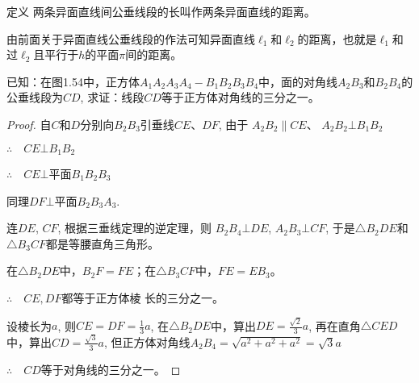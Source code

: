 \begin{blk}
  {定义} 两条异面直线间公垂线段的长叫作两条异面直线的距离。
\end{blk}


由前面关于异面直线公垂线段的作法可知异面直线$\ell_1$和$\ell_2$的距离，也就是$\ell_1$和过$\ell_2$且平行于$h$的平面$\pi$间的距离。

\begin{example}
  已知：在图1.54中，正方体$A_1A_2A_3A_4-B_1B_2B_3B_4$中，面的对角线$A_2B_3$和$B_2B_4$的公垂线段为$CD$, 求证：线段$CD$等于正方体对角线的三分之一。
\end{example}

\begin{figure}[htp]
  \centering
{}
  \caption{}
\end{figure}

\begin{proof}
  自$C$和$D$分别向$B_2B_3$引垂线$CE$、$DF$, 由于
$A_2B_2\parallel CE$、 $A_2B_2\bot B_1B_2$

$\therefore\quad CE\bot B_1B_2$

$\therefore\quad CE\bot$平面$B_1B_2B_3$

同理$DF\bot $平面$B_2B_3A_3$.

连$DE$, $CF$, 根据三垂线定理的逆定理，则
$B_2B_4\bot DE$, $A_2B_3\bot CF$, 于是$\triangle B_2DE$和$\triangle B_3CF$都是等腰直角三角形。

在$\triangle B_2DE$中，$B_2F=FE$；在$\triangle B_3CF$中，$FE=EB_3$。

$\therefore\quad CE, DF$都等于正方体棱
长的三分之一。

设棱长为$a$, 则$CE=DF=\frac{1}{3}a$, 在$\triangle B_2DE$中，算出$DE=\frac{\sqrt{2}}{3}a$, 再在直角$\triangle CED$中，算出$CD=\frac{\sqrt{3}}{3}a$, 但正方体对角线$A_2B_4=\sqrt{a^2+a^2+a^2}=\sqrt{3}a$

$\therefore\quad CD$等于对角线的三分之一。
\end{proof}

